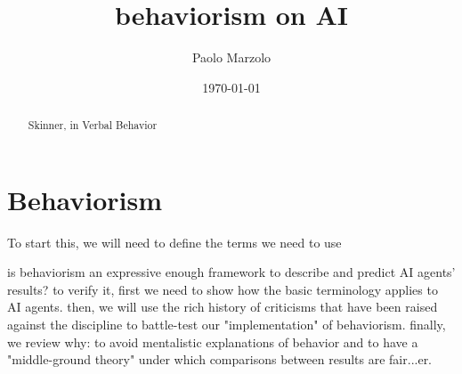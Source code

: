 \documentclass[letterpaper,11pt,twocolumn]{article}
\title{behaviorism on AI}
\author{Paolo Marzolo}
\date{\today}
\begin{document}
\maketitle

\begin{abstract}
    Skinner, in Verbal Behavior\cite{skinner_verbal_1992}
\end{abstract}

\section{Behaviorism}
To start this, we will need to define the terms we need to use

is behaviorism an expressive enough framework to describe and predict AI agents' results?
to verify it, first we need to show how the basic terminology applies to AI agents. then, we will use the rich history of criticisms that have been raised against the discipline to battle-test our "implementation" of behaviorism. finally, we review why: to avoid mentalistic explanations of behavior and to have a "middle-ground theory" under which comparisons between results are fair...er.


\printbibliography
\end{document}
